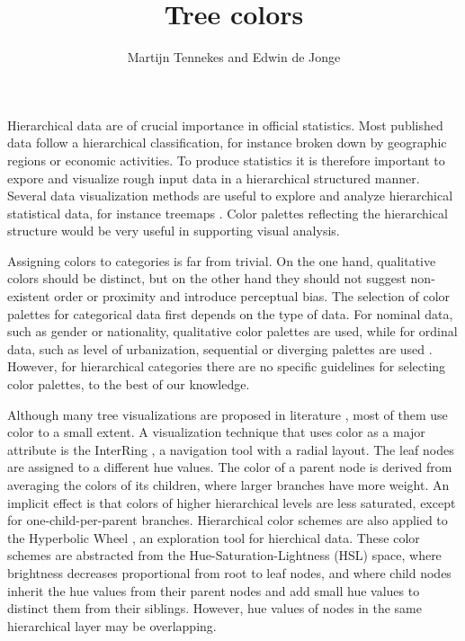 \documentclass[journal]{vgtc}                %
\title{Tree colors}
\author{Martijn Tennekes and Edwin de Jonge}
\begin{document}


\maketitle

Hierarchical data are of crucial importance in official statistics. Most published data follow a hierarchical classification, for instance broken down by geographic regions or economic activities. To produce statistics it is therefore important to expore and visualize rough input data in a hierarchical structured manner. Several data visualization methods are useful to explore and analyze hierarchical statistical data, for instance treemaps
\cite{shneiderman1992,tennekes2011b}. Color palettes reflecting the hierarchical structure would be very useful in supporting visual analysis.

Assigning colors to categories is far from trivial. On the one hand, qualitative colors should be distinct, but on the other hand they should not suggest non-existent order or proximity and introduce perceptual bias. The selection of color palettes for categorical data first depends on the type of data. For nominal data, such as gender or nationality, qualitative color palettes are used, while for ordinal data, such as level of urbanization, sequential or diverging palettes are used \cite{brewer03, zeileis2009}. However, for hierarchical categories there are no specific guidelines for selecting color palettes, to the best of our knowledge.

Although many tree visualizations are proposed in literature \cite{schulz2011}, most of them use color to a small extent. A visualization technique that uses color as a major attribute is the InterRing \cite{yang2002}, a navigation tool with a radial layout. The leaf nodes are assigned to a different hue values. The color of a parent node is derived from averaging the colors of its children, where larger branches have more weight. An implicit effect is that colors of higher hierarchical levels are less saturated, except for one-child-per-parent branches. Hierarchical color schemes are also applied to the Hyperbolic Wheel \cite{lam2012}, an exploration tool for hierchical data.  These color schemes are abstracted from the Hue-Saturation-Lightness (HSL) space, where brightness decreases proportional from root to leaf nodes, and where child nodes inherit the hue values from their parent nodes and add small hue values to distinct them from their siblings. However, hue values of nodes in the same hierarchical layer may be overlapping.
\end{document}
